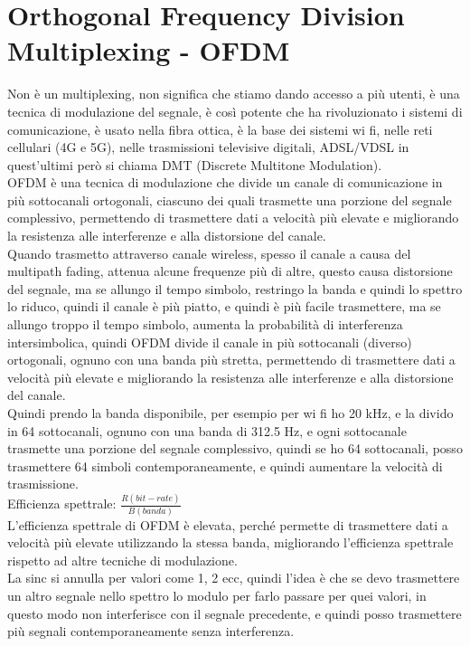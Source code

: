 \section{Orthogonal Frequency Division Multiplexing - OFDM}
Non è un multiplexing, non significa che stiamo dando accesso a più utenti, è una tecnica 
di modulazione del segnale, è così potente che ha rivoluzionato i sistemi di comunicazione, 
è usato nella fibra ottica, è la base dei sistemi wi fi, nelle reti cellulari (4G e 5G), nelle trasmissioni televisive digitali,
ADSL/VDSL in quest'ultimi però si chiama DMT (Discrete Multitone Modulation).\\

OFDM è una tecnica di modulazione che divide un canale di comunicazione in più sottocanali ortogonali,
ciascuno dei quali trasmette una porzione del segnale complessivo, permettendo di trasmettere dati a 
velocità più elevate e migliorando la resistenza alle interferenze e alla distorsione del canale.\\

Quando trasmetto attraverso canale wireless, spesso il canale a causa del multipath fading, 
attenua alcune frequenze più di altre, questo causa distorsione del segnale, ma se allungo il tempo simbolo, 
restringo la banda e quindi lo spettro lo riduco, quindi il canale è più piatto, e quindi è più facile trasmettere, ma se allungo troppo il tempo simbolo,
aumenta la probabilità di interferenza intersimbolica, quindi OFDM divide il canale in più sottocanali (diverso) ortogonali, 
ognuno con una banda più stretta, permettendo di trasmettere dati a velocità più elevate e migliorando la resistenza 
alle interferenze e alla distorsione del canale.\\

Quindi prendo la banda disponibile, per esempio per wi fi ho 20 kHz, e la divido in 64 sottocanali, ognuno con una banda di 
312.5 Hz, e ogni sottocanale trasmette una porzione del segnale complessivo, quindi se ho 64 sottocanali, posso trasmettere 64 
simboli contemporaneamente, e quindi aumentare la velocità di trasmissione.\\

Efficienza spettrale: $\frac {R(bit-rate)}{B(banda)}$\\
L'efficienza spettrale di OFDM è elevata, perché permette di trasmettere dati a velocità più elevate utilizzando la stessa banda, 
migliorando l'efficienza spettrale rispetto ad altre tecniche di modulazione.\\
La sinc si annulla per valori come 1, 2 ecc, quindi l'idea è che se devo trasmettere un altro segnale nello spettro lo modulo
per farlo passare per quei valori, in questo modo non interferisce con il segnale precedente, e quindi posso trasmettere più segnali 
contemporaneamente senza interferenza.\\

